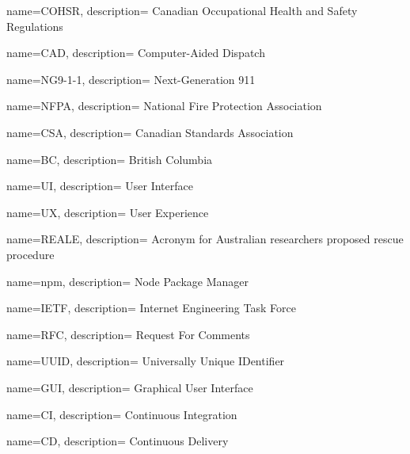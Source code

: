 {
  name={COHSR},
  description={
    Canadian Occupational Health and Safety Regulations
  }
}

{
  name={CAD},
  description={
    Computer-Aided Dispatch
  }
}

{
  name={NG9-1-1},
  description={
    Next-Generation 911
  }
}

{
  name={NFPA},
  description={
    National Fire Protection Association
  }
}

{
  name={CSA},
  description={
    Canadian Standards Association
  }
}

{
  name={BC},
  description={
    British Columbia
  }
}

{
  name={UI},
  description={
    User Interface
  }
}

{
  name={UX},
  description={
    User Experience
  }
}

{
  name={REALE},
  description={
    Acronym for Australian researchers proposed rescue procedure
  }
}

{
  name={npm},
  description={
    Node Package Manager
  }
}

{
  name={IETF},
  description={
    Internet Engineering Task Force
  }
}

{
  name={RFC},
  description={
    Request For Comments
  }
}

{
  name={UUID},
  description={
    Universally Unique IDentifier
  }
}

{
  name={GUI},
  description={
    Graphical User Interface
  }
}

{
  name={CI},
  description={
    Continuous Integration
  }
}

{
  name={CD},
  description={
    Continuous Delivery
  }
}
